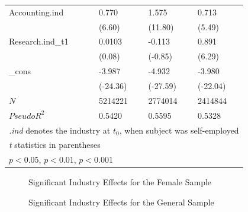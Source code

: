 \begin{longtable}{p{3 cm} p{2.25 cm} p{2.25 cm} p{2.25 cm}}
Accounting.ind &       0.770\sym{***}&       1.575\sym{***}&       0.713\sym{***}\\
            &      (6.60)         &     (11.80)         &      (5.49)         \\
Research.ind\_t1 &      0.0103         &      -0.113 &      0.891\sym{***}         \\
            &      (0.08)         &      (-0.85)        &      (6.29)        \\
\_cons      &      -3.987\sym{***}&      -4.932\sym{***}&      -3.980\sym{***}\\
            &    (-24.36)         &    (-27.59)         &    (-22.04)         \\
\hline
\(N\)       &     5214221         &     2774014         &     2414844         \\
\(Pseudo R^2\)       &   0.5420         &    0.5595       &    0.5328      \\
\hline\hline
\multicolumn{4}{l}{\footnotesize \textit{.ind} denotes the industry at $t_0$, when subject was self-employed}\\
\multicolumn{4}{l}{\footnotesize \textit{t} statistics in parentheses}\\
\multicolumn{4}{l}{\footnotesize \sym{*} \(p<0.05\), \sym{**} \(p<0.01\), \sym{***} \(p<0.001\)}\\
\end{longtable}
\bodyspacing

\begin{figure}[hbtp]
    \caption{Significant Industry Effects for the Female Sample} 
\end{figure}

\begin{figure}[hbtp]
    \caption{Significant Industry Effects for the General Sample} 
\end{figure}

